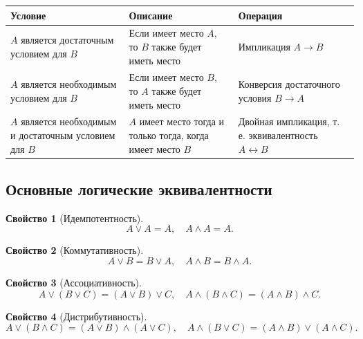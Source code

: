 \documentclass[a5paper, 11pt]{extarticle}
\theoremstyle{definition}
\newtheorem{property}{Свойство}[subsection]
\theoremstyle{definition}
\theoremstyle{definition}
\numberwithin{figure}{section}
\numberwithin{table}{section}
\begin{document}
{
    \renewcommand*{\arraystretch}{1.5}
    \begin{longtable}{|C{0.27\textwidth}|C{0.27\textwidth}|C{0.27\textwidth}|}
        \hline
        \textbf{Условие}                                            & \textbf{Описание}                                               & \textbf{Операция}                                                 \\
        \hline
        \(A\) является достаточным условием для \(B\)               & Если имеет место \(A\), то \(B\) также будет иметь место        & Импликация \(A \to B\)                                            \\
        \hline
        \(A\) является необходимым условием для \(B\)               & Если имеет место \(B\), то \(A\) также будет иметь место        & Конверсия достаточного условия \(B \to A\)                        \\
        \hline
        \(A\) является необходимым и достаточным условием для \(B\) & \(A\) имеет место тогда и только тогда, когда имеет место \(B\) & Двойная импликация, т. е. эквивалентность \(A \leftrightarrow B\) \\
        \hline
    \end{longtable}
}

\subsection{Основные логические эквивалентности}

\begin{property}[Идемпотентность]
    \[
        A \lor A = A,
        \quad
        A \land A = A.
    \]
\end{property}

\begin{property}[Коммутативность]
    \[
        A \lor B = B \lor A,
        \quad
        A \land B = B \land A.
    \]
\end{property}

\begin{property}[Ассоциативность]
    \[
        A \lor (B \lor C) = (A \lor B) \lor C,
        \quad
        A \land (B \land C) = (A \land B) \land C.
    \]
\end{property}

\begin{property}[Дистрибутивность]
    \[
        A \lor (B \land C) = (A \lor B) \land (A \lor C),
        \quad
        A \land (B \lor C) = (A \land B) \lor (A \land C).
    \]
\end{property}
\end{document}
